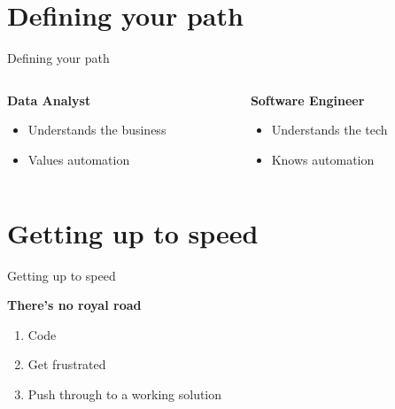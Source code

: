 \section{Defining your path}

\begin{frame}{Defining your path}
    \begin{columns}
        \begin{column}{0.5\textwidth}
            \centering%
            {\large\bf%
             Data Analyst} \\[\medskipamount]
            \begin{itemize}
                \setlength{\itemsep}{\medskipamount}
                \item Understands the business
                \item Values automation
            \end{itemize}
        \end{column}
        \begin{column}{0.5\textwidth}
            \centering%
            {\large\bf%
             Software Engineer} \\[\medskipamount]
            \begin{itemize}
                \setlength{\itemsep}{\medskipamount}
                \item Understands the tech
                \item Knows automation
            \end{itemize}
        \end{column}
    \end{columns}
\end{frame}

\section{Getting up to speed}

\begin{frame}{Getting up to speed}
    \begin{center}
        \large\bf%
        There's no royal road
    \end{center}
    \begin{enumerate}
        \setlength{\itemsep}{\medskipamount}
        \item Code
        \item Get frustrated
        \item Push through to a working solution
    \end{enumerate}
\end{frame}

